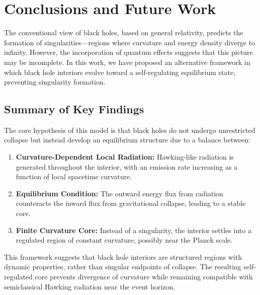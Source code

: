 \section{Conclusions and Future Work}
\label{sec:conclusions}

The conventional view of black holes, based on general relativity, predicts the formation of singularities—regions where curvature and energy density diverge to infinity. However, the incorporation of quantum effects suggests that this picture may be incomplete. In this work, we have proposed an alternative framework in which black hole interiors evolve toward a self-regulating equilibrium state, preventing singularity formation.

\subsection{Summary of Key Findings}
The core hypothesis of this model is that black holes do not undergo unrestricted collapse but instead develop an equilibrium structure due to a balance between:
\begin{enumerate}
    \item \textbf{Curvature-Dependent Local Radiation:} Hawking-like radiation is generated throughout the interior, with an emission rate increasing as a function of local spacetime curvature.
    \item \textbf{Equilibrium Condition:} The outward energy flux from radiation counteracts the inward flux from gravitational collapse, leading to a stable core.
    \item \textbf{Finite Curvature Core:} Instead of a singularity, the interior settles into a regulated region of constant curvature, possibly near the Planck scale.
\end{enumerate}

This framework suggests that black hole interiors are structured regions with dynamic properties, rather than singular endpoints of collapse. The resulting self-regulated core prevents divergence of curvature while remaining compatible with semiclassical Hawking radiation near the event horizon.

